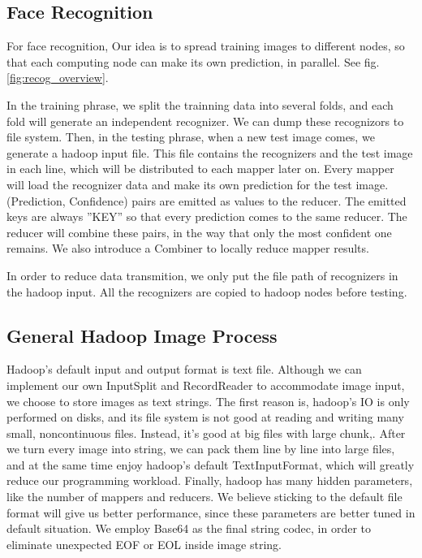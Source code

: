 \documentclass[11pt, draftclsnofoot, onecolumn]{IEEEtran}
\begin{document}
\subsection{Face Recognition}
For face recognition, Our idea is to spread training images to different nodes, so that each computing node can make its own prediction, in parallel. See fig.\ref{fig:recog_overview}.

In the training phrase, we split the trainning data into several folds, and each fold will generate an independent recognizer. We can dump these recognizors to file system. Then, in the testing phrase, when a new test image comes, we generate a hadoop input file. This file contains the recognizers and the test image in each line, which will be distributed to each mapper later on. Every mapper will load the recognizer data and make its own prediction for the test image. (Prediction, Confidence) pairs are emitted as values to the reducer. The emitted keys are always ''KEY'' so that every prediction comes to the same reducer. The reducer will combine these pairs, in the way that only the most confident one remains. We also introduce a Combiner to locally reduce mapper results.

In order to reduce data transmition, we only put the file path of recognizers in the hadoop input. All the recognizers are copied to hadoop nodes before testing.

\subsection {General Hadoop Image Process}

Hadoop's default input and output format is text file. Although we can implement our own InputSplit and RecordReader to accommodate image input, we choose to store images as text strings. The first reason is, hadoop's IO is only performed on disks, and its file system is not good at reading and writing many small, noncontinuous files. Instead, it's good at big files with large chunk,\cite{sweeney2011hipi}. After we turn every image into string, we can pack them line by line into large files, and at the same time enjoy hadoop's default TextInputFormat, which will greatly reduce our programming workload. Finally, hadoop has many hidden parameters, like the number of mappers and reducers. We believe sticking to the default file format will give us better performance, since these parameters are better tuned in default situation. We employ Base64 as the final string codec, in order to eliminate unexpected EOF or EOL inside image string.
\end{document}
